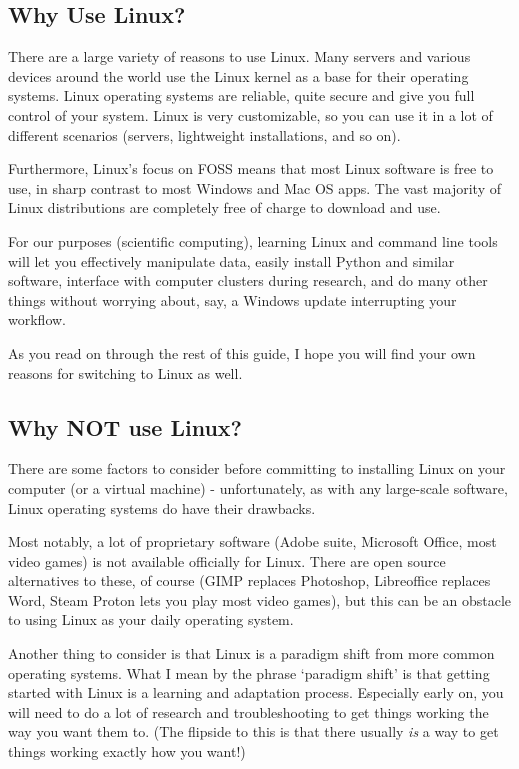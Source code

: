 \documentclass[12pt]{article}
\begin{document}
\subsection*{Why Use Linux?}

There are a large variety of reasons to use Linux. Many servers and various devices around the world use the Linux kernel as a base for their operating systems. Linux operating systems are reliable, quite secure and give you full control of your system. Linux is very customizable, so you can use it in a lot of different scenarios (servers, lightweight installations, and so on).

Furthermore, Linux's focus on FOSS means that most Linux software is free to use, in sharp contrast to most Windows and Mac OS apps. The vast majority of Linux distributions are completely free of charge to download and use.

For our purposes (scientific computing), learning Linux and command line tools will let you effectively manipulate data, easily install Python and similar software, interface with computer clusters during research, and do many other things without worrying about, say, a Windows update interrupting your workflow.

As you read on through the rest of this guide, I hope you will find your own reasons for switching to Linux as well.

\subsection*{Why NOT use Linux?}

There are some factors to consider before committing to installing Linux on your computer (or a virtual machine) - unfortunately, as with any large-scale software, Linux operating systems do have their drawbacks.

Most notably, a lot of proprietary software (Adobe suite, Microsoft Office, most video games) is not available officially for Linux. There are open source alternatives to these, of course (GIMP replaces Photoshop, Libreoffice replaces Word, Steam Proton lets you play most video games), but this can be an obstacle to using Linux as your daily operating system.

Another thing to consider is that Linux is a paradigm shift from more common operating systems. What I mean by the phrase `paradigm shift' is that getting started with Linux is a learning and adaptation process. Especially early on, you will need to do a lot of research and troubleshooting to get things working the way you want them to. (The flipside to this is that there usually \textit{is} a way to get things working exactly how you want!)
\end{document}
